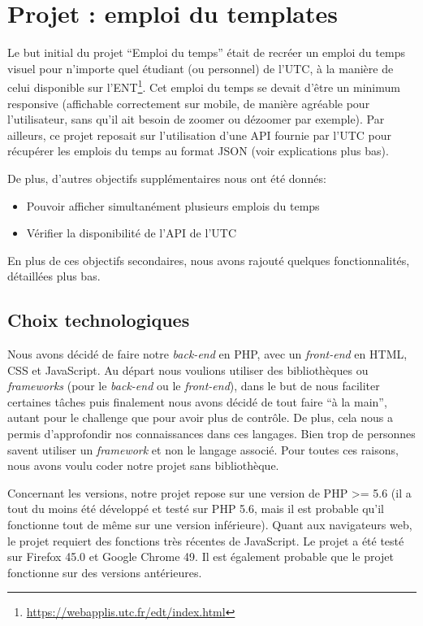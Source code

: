 \chapter{Projet : emploi du templates}

Le but initial du projet ``Emploi du temps'' était de recréer un emploi du temps visuel pour n'importe quel étudiant (ou personnel) de l'UTC, à la manière de celui disponible sur l'ENT\footnote{\url{https://webapplis.utc.fr/edt/index.html}}. Cet emploi du temps se devait d'être un minimum responsive (affichable correctement sur mobile, de manière agréable pour l'utilisateur, sans qu'il ait besoin de zoomer ou dézoomer par exemple). Par ailleurs, ce projet reposait sur l'utilisation d'une API fournie par l'UTC pour récupérer les emplois du temps au format JSON (voir explications plus bas).

\medskip

\noindent De plus, d'autres objectifs supplémentaires nous ont été donnés:
\begin{itemize}
  \item Pouvoir afficher simultanément plusieurs emplois du temps
  \item Vérifier la disponibilité de l'API de l'UTC
\end{itemize}
En plus de ces objectifs secondaires, nous avons rajouté quelques fonctionnalités, détaillées plus bas.

\section{Choix technologiques}

Nous avons décidé de faire notre \textit{back-end} en PHP, avec un \textit{front-end} en HTML, CSS et JavaScript. Au départ nous voulions utiliser des bibliothèques ou \textit{frameworks} (pour le \textit{back-end} ou le \textit{front-end}), dans le but de nous faciliter certaines tâches puis finalement nous avons décidé de tout faire ``à la main'', autant pour le challenge que pour avoir plus de contrôle. De plus, cela nous a permis d'approfondir nos connaissances dans ces langages. Bien trop de personnes savent utiliser un \textit{framework} et non le langage associé. Pour toutes ces raisons, nous avons voulu coder notre projet sans bibliothèque.

\medskip

Concernant les versions, notre projet repose sur une version de PHP >= 5.6 (il a tout du moins été développé et testé sur PHP 5.6, mais il est probable qu'il fonctionne tout de même sur une version inférieure). Quant aux navigateurs web, le projet requiert des fonctions très récentes de JavaScript. Le projet a été testé sur Firefox 45.0 et Google Chrome 49. Il est également probable que le projet fonctionne sur des versions antérieures.

